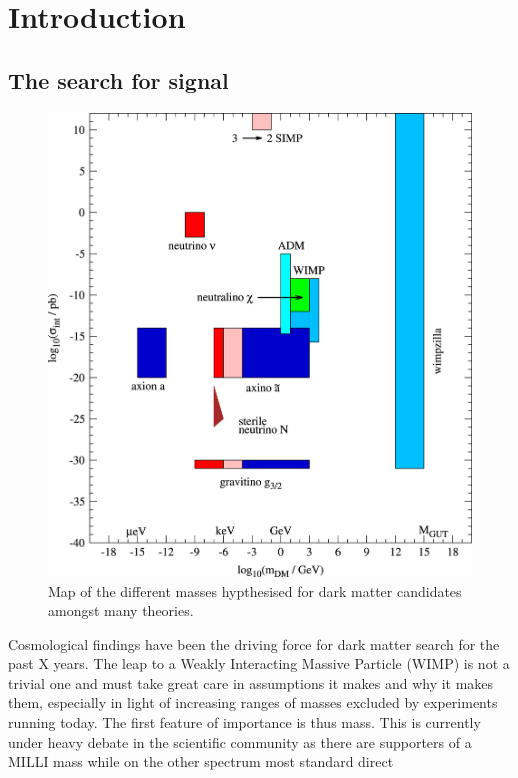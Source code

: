 \documentclass[11pt]{article} %
\begin{document}
\pagebreak
\section{Introduction}
\subsection{The search for signal}
\begin{figure}[H]
\centering
\includegraphics[scale=1]{images/mass_ranges.jpg}
\caption{\cite{BAER20151} Map of the different masses hypthesised for dark matter candidates amongst many theories.}
\label{fig:mass_ranges}
\end{figure}
\par Cosmological findings have been the driving force for dark matter search for the past X years.
The leap to a Weakly Interacting Massive Particle (WIMP) is not a trivial one and must take great care in assumptions
it makes and why it makes them, especially in light of increasing ranges of masses excluded by experiments running today.
The first feature of importance is thus mass.
This is currently under heavy debate in the scientific community as there are supporters of a MILLI mass while on the other spectrum most standard direct
\end{document}
